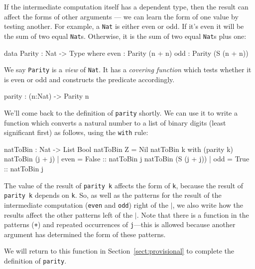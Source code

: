 If the intermediate computation itself has a dependent type, then the result can affect the forms of other arguments --- we can learn the form of one value by testing another.
For example, a \texttt{Nat} is either even or odd.
If it's even it will be the sum of two equal \texttt{Nat}s.
Otherwise, it is the sum of two equal \texttt{Nat}s  plus one:

\begin{code}
data Parity : Nat -> Type where
   even : Parity (n + n)
   odd  : Parity (S (n + n))
\end{code}

\noindent
We say \texttt{Parity} is a \emph{view} of \texttt{Nat}. 
It has a \emph{covering function} which tests whether it is even or odd and constructs the predicate accordingly.

\begin{code}
parity : (n:Nat) -> Parity n
\end{code}

\label{sect:nattobin}

\noindent
We'll come back to the definition of \texttt{parity} shortly.
We can use it to write a function which converts a natural number to a list of binary digits (least significant first) as follows, using the \texttt{with} rule:

\begin{code}
natToBin : Nat -> List Bool
natToBin Z = Nil
natToBin k with (parity k)
   natToBin (j + j)     | even = False :: natToBin j
   natToBin (S (j + j)) | odd  = True  :: natToBin j
\end{code}

\noindent
The value of the result of \texttt{parity k} affects the form of \texttt{k}, because the result of \texttt{parity k} depends on \texttt{k}. 
So, as well as the patterns for the result of the intermediate computation (\texttt{even} and \texttt{odd}) right of the  \texttt{$\mid$}, we also write how the results affect the other patterns left of the $\mid$.
Note that there is a function in the patterns (\texttt{+}) and repeated occurrences of \texttt{j}---this is allowed because another argument has determined the form of these patterns.

We will return to this function in Section~\ref{sect:provisional} to complete the definition of \texttt{parity}.


